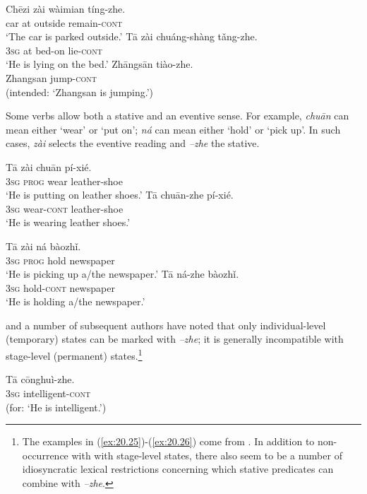 \ea \label{ex:20.22}
\ea  \gll  Chēzi  zài  wàimian  tíng-zhe.\\
car  at  outside  remain-\textsc{cont} \\
\glt ‘The car is parked outside.’ 
\ex \gll  Tā  zài  chuáng-shàng  tǎng-zhe.\\
\textsc{3sg}  at  bed-on  lie-\textsc{cont}\\
\glt ‘He is lying on the bed.’  
\ex \gll  *Zhāngsān  tiào-zhe.\\
  Zhangsan  jump-\textsc{cont}\\
\glt (intended: ‘Zhangsan is jumping.’)   
\z \z


Some verbs allow both a stative and an eventive sense. For example, \textit{chuān} can mean either ‘wear’ or ‘put on’; \textit{ná} can mean either ‘hold’ or ‘pick up’. In such cases, \textit{zài} selects the eventive reading and \textit{–zhe} the stative.


\ea \label{ex:20.23}
\ea  \gll  Tā  zài  chuān  pí-xié.\\
\textsc{3sg}  \textsc{prog}  wear  leather-shoe\\
\glt ‘He is putting on leather shoes.’ 
\ex \gll Tā  chuān-zhe  pí-xié.\\
\textsc{3sg}  wear-\textsc{cont}  leather-shoe\\
\glt ‘He is wearing leather shoes.’ 
\z \z

\ea \label{ex:20.24}
\ea  \gll  Tā  zài  ná  bàozhǐ.\\
\textsc{3sg}  \textsc{prog}  hold  newspaper\\
\glt ‘He is picking up a/the newspaper.’ 
\ex \gll  Tā  ná-zhe  bàozhǐ.\\
\textsc{3sg}  hold-\textsc{cont}  newspaper\\
\glt ‘He is holding a/the newspaper.’ 
\z \z


\citet{Yeh1993} and a number of subsequent authors have noted that only individual-level (temporary) states can be marked with \textit{–zhe}; it is generally incompatible with stage-level (permanent) states.\footnote{The examples in (\ref{ex:20.25})-(\ref{ex:20.26}) come from \citet[274]{Smith1997}. In addition to non-occurrence with with stage-level states, there also seem to be a number of idiosyncratic lexical restrictions concerning which stative predicates can combine with \textit{–zhe}.} 


\ea \label{ex:20.25}
\gll   *Tā  c\=onghuì-zhe.\\
  \textsc{3sg}  intelligent-\textsc{cont}  \\
\glt (for: ‘He is intelligent.’) 
\z


